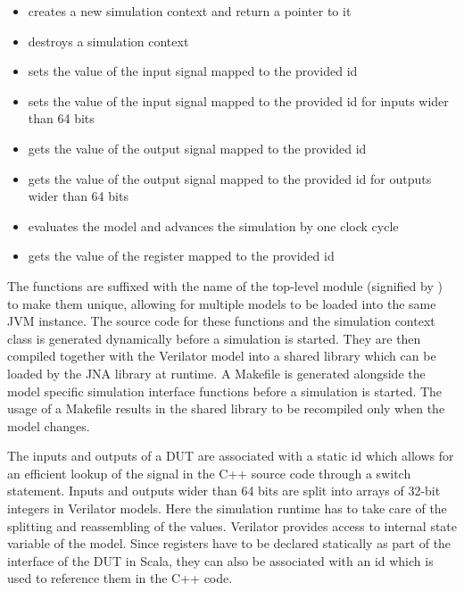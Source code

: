 
\begin{itemize}
  \item {} creates a new simulation context and return a pointer to it
  \item {} destroys a simulation context
  \item {} sets the value of the input signal mapped to the provided id
  \item {} sets the value of the input signal mapped to the provided id for inputs wider than 64 bits
  \item {} gets the value of the output signal mapped to the provided id
  \item {} gets the value of the output signal mapped to the provided id for outputs wider than 64 bits
  \item {} evaluates the model and advances the simulation by one clock cycle
  \item {} gets the value of the register mapped to the provided id
\end{itemize}

The functions are suffixed with the name of the top-level module (signified by ) to make them unique,
allowing for multiple models to be loaded into the same JVM instance. The source code for these functions and the simulation context class is generated dynamically before a simulation is started. They are then
compiled together with the Verilator model into a shared library which can be loaded by the JNA library at runtime. A
Makefile is generated alongside the model specific simulation interface functions before a
simulation is started. The usage of a Makefile results in the shared library to be recompiled only when the model changes.

The inputs and outputs of a DUT are associated with a static id which allows for an efficient lookup of the signal in the C++ source code through a switch statement. Inputs and outputs wider than 64 bits are split into arrays of 32-bit integers in Verilator models. Here the simulation runtime has to take care of the splitting and reassembling of the values. Verilator provides access to internal state variable of the model. Since registers have to be declared statically as part of the interface of the DUT in Scala, they can also be associated with an id which is used to reference them in the C++ code.


